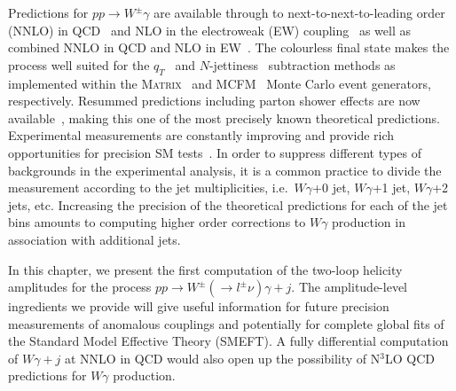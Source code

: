 \documentclass[main.tex]{subfiles}
\begin{document}
Predictions for $pp\to W^\pm\gamma$ are available through to next-to-next-to-leading order (NNLO) in
QCD~\cite{Gehrmann:2011ab,Grazzini:2015nwa,Campbell:2021mlr} and NLO in the electroweak (EW)
coupling~\cite{Accomando:2005ra,Denner:2014bna} as well as combined NNLO in QCD and NLO in EW~\cite{Grazzini:2019jkl}. The colourless final state makes the process well
suited for the $q_T$~\cite{Catani:2007vq} and $N$-jettiness~\cite{Boughezal:2015aha,Gaunt:2015pea} subtraction methods as implemented within the \textsc{Matrix}~\cite{Grazzini:2017mhc}
and \textsc{MCFM}~\cite{Boughezal:2016wmq} Monte Carlo event generators, respectively. Resummed predictions including parton shower
effects are now available~\cite{Cridge:2021hfr}, making this one of the most precisely known
theoretical predictions. Experimental measurements are constantly improving and provide rich
opportunities for precision SM tests~\cite{CMS:2021foa,CMS:2021cxr}.
In order to suppress different types of backgrounds in the experimental analysis, it is a common
practice to divide the measurement according to the jet multiplicities, i.e.\  $W\gamma$+0 jet,
$W\gamma$+1 jet, $W\gamma$+2 jets, etc. Increasing the precision of the theoretical predictions for
each of the jet bins amounts to computing higher order corrections to $W\gamma$ production in association
with additional jets.

In this chapter, we present the first computation of the two-loop helicity amplitudes for the process $pp\to W^\pm(\to l^\pm\nu)\gamma + j$. The amplitude-level ingredients we provide will give useful information for future precision 
measurements of anomalous couplings and potentially for complete global fits of the Standard Model
Effective Theory (SMEFT). A fully differential computation of $W\gamma+j$ at NNLO in QCD would also
open up the possibility of N${}^3$LO QCD predictions for $W\gamma$ production.

\end{document}
